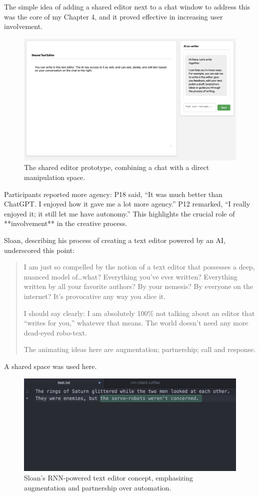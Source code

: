 The simple idea of adding a shared editor next to a chat window to address this was the core of my Chapter 4, and it proved effective in increasing user involvement.

\begin{figure}[H]
    \centering
    \includegraphics[width=1\linewidth]{sharededitor.png}
    \caption{The shared editor prototype, combining a chat with a direct manipulation space.}
    \label{fig:shared-editor}
\end{figure}

Participants reported more agency: P18 said, “It was much better than ChatGPT. I enjoyed how it gave me a lot more agency.” P12 remarked, “I really enjoyed it; it still let me have autonomy.” This highlights the crucial role of **involvement** in the creative process.

Sloan, describing his process of creating a text editor powered by an AI, underscored this point:
\begin{quote}
I am just so compelled by the notion of a text editor that possesses a deep, nuanced model of…what? Everything you’ve ever written? Everything written by all your favorite authors? By your nemesis? By everyone on the internet? It’s provocative any way you slice it.

I should say clearly: I am absolutely 100\% not talking about an editor that “writes for you,” whatever that means. The world doesn’t need any more dead-eyed robo-text.

The animating ideas here are augmentation; partnership; call and response.
\end{quote}
A shared space was used here.

\begin{figure}
    \centering
    \includegraphics[width=1\linewidth]{rnn.png}
    \caption{Sloan's RNN-powered text editor concept, emphasizing augmentation and partnership over automation.}
    \label{fig:enter-label}
\end{figure}

